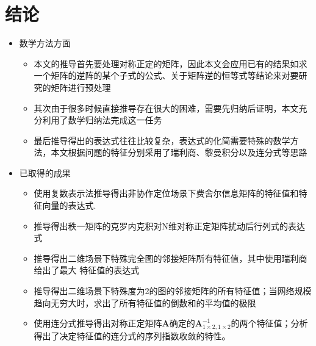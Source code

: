 \section{结论}\label{section:conclusion}
  \begin{itemize}
  \item 
  数学方法方面
  \begin{itemize}
  \item 本文的推导首先要处理对称正定的矩阵，因此本文会应用已有的结果如求一个矩阵的逆阵的某个子式的公式、关于矩阵逆的恒等式等结论来对要研究的矩阵进行预处理
  \item 其次由于很多时候直接推导存在很大的困难，需要先归纳后证明，本文充分利用了数学归纳法完成这一任务
  \item 最后推导得出的表达式往往比较复杂，表达式的化简需要特殊的数学方法，本文根据问题的特征分别采用了瑞利商、黎曼积分以及连分式等思路
  \end{itemize}
  \item
    已取得的成果
  \begin{itemize}
  \item
    使用复数表示法推导得出非协作定位场景下费舍尔信息矩阵的特征值和特征向量的表达式.
  \item
    推导得出秩一矩阵的克罗内克积对N维对称正定矩阵扰动后行列式的表达式
  \item
    推导得出二维场景下特殊完全图的邻接矩阵所有特征值，其中使用瑞利商给出了最大 特征值的表达式
  \item 推导得出二维场景下特殊度为2的图的邻接矩阵的所有特征值；当网络规模趋向无穷大时，求出了所有特征值的倒数和的平均值的极限
  \item 使用连分式推导得出对称正定矩阵$\bm{A}$确定的$\bm{A}^{-1}_{1\times2,1\times2}$的两个特征值；分析得出了决定特征值的连分式的序列指数收敛的特性。
  \end{itemize}
  \end{itemize}

